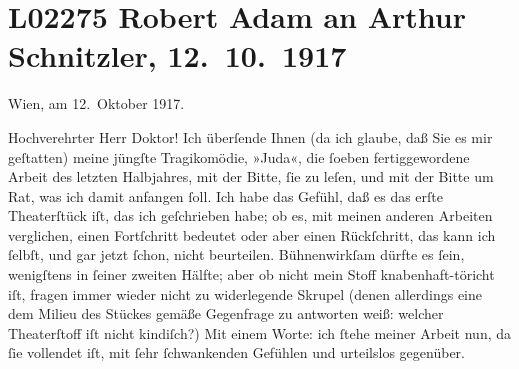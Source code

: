 

\section[Robert Adam an Arthur Schnitzler, 12. 10. 1917]{L02275 Robert Adam an Arthur Schnitzler, 12. 10. 1917}
\nopagebreak{}
\rehead{ }\normalsize\beginnumbering{}
\toendnotes[C]{\smallbreak\pagebreak[2]}
\pstart
           \raggedleft{}{\pb}Wien, am 12. Oktober
                  1917.\pend
           
\pstart{}Hochverehrter Herr Doktor!\pend\vspace{0.5em}
\pstart
           Ich überſende Ihnen (da ich glaube, daß Sie es mir geſtatten) meine jüngſte
               Tragikomödie, »Juda«, die ſoeben fertiggewordene
               Arbeit des letzten Halbjahres, mit der Bitte, ſie zu leſen, und mit der Bitte um Rat,
               was ich damit anfangen ſoll. Ich habe das Gefühl, daß es das erſte Theaterſtück iſt,
               das ich geſchrieben habe; ob es, mit meinen anderen Arbeiten verglichen, einen
               Fortſchritt bedeutet oder aber einen Rückſchritt, das kann ich ſelbſt, und gar jetzt
               ſchon, nicht beurteilen. Bühnenwirkſam dürfte es ſein, wenigſtens in ſeiner zweiten
               Hälfte; aber ob nicht mein Stoff {\pb}knabenhaft-töricht
               iſt, fragen immer wieder nicht zu widerlegende Skrupel (denen allerdings eine dem
               Milieu des Stückes gemäße Gegenfrage zu antworten weiß: welcher Theaterſtoff iſt
               nicht kindiſch?) Mit einem Worte: ich ſtehe meiner Arbeit nun, da ſie vollendet iſt,
               mit ſehr ſchwankenden Gefühlen und urteilslos gegenüber.\pend
           
